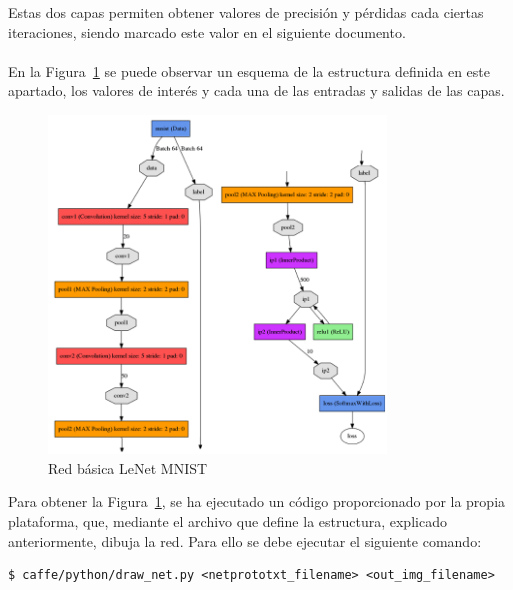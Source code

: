 \begin{description}
	Estas dos capas permiten obtener valores de precisión y pérdidas cada ciertas iteraciones, siendo marcado este valor en el siguiente documento.\\
	\vspace{-10pt}
	\\
	En la Figura~\ref{fig.redBasica} se puede observar un esquema de la estructura definida en este apartado, los valores de interés y cada una de las entradas y salidas de las capas.
	
	\begin{figure}[h!]
		\begin{center}
			\includegraphics[width=0.8\textwidth]{figures/Original_net}
			\caption{Red básica LeNet MNIST}
			\label{fig.redBasica}
		\end{center}
	\end{figure}
	
	Para obtener la Figura~\ref{fig.redBasica}, se ha ejecutado un código proporcionado por la propia plataforma, que, mediante el archivo que define la estructura, explicado anteriormente, dibuja la red. Para ello se debe ejecutar el siguiente comando:
	\vspace{10pt}
	\begin{lstlisting}[frame=single]
	$ caffe/python/draw_net.py <netprototxt_filename> <out_img_filename>
	\end{lstlisting}
	

\end{description}
